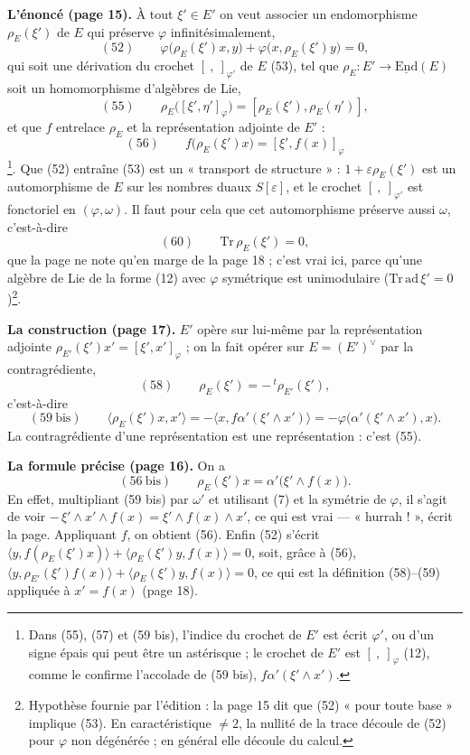 \documentclass[11pt,a4paper]{article}
\begin{document}
\textbf{L'énoncé (page 15).} À tout $\xi' \in E'$ on veut associer un endomorphisme
$\rho_E(\xi')$ de $E$ qui préserve $\varphi$ infinitésimalement,
\[
  (52) \qquad \varphi\bigl(\rho_E(\xi')x, y\bigr) + \varphi\bigl(x, \rho_E(\xi')y\bigr) = 0 ,
\]
qui soit une dérivation du crochet $[\ ,\ ]_{\varphi'}$ de $E$ (53), tel que
$\rho_E : E' \to \underline{\mathrm{End}}(E)$ soit un homomorphisme d'algèbres de Lie,
\[
  (55) \qquad \rho_E\bigl([\xi', \eta']_{\varphi}\bigr) = [\rho_E(\xi'), \rho_E(\eta')] ,
\]
et que $f$ entrelace $\rho_E$ et la représentation adjointe de $E'$ :
\[
  (56) \qquad f\bigl(\rho_E(\xi')x\bigr) = [\xi', f(x)]_{\varphi}
\]
\footnote{Dans (55), (57) et (59 bis), l'indice du crochet de $E'$ est écrit
$\varphi'$, ou d'un signe épais qui peut être un astérisque ; le crochet de $E'$
est $[\ ,\ ]_{\varphi}$ (12), comme le confirme l'accolade de (59 bis),
$f\alpha'(\xi' \wedge x')$.}. Que (52) entraîne (53) est un « transport de
structure » : $1 + \varepsilon\rho_E(\xi')$ est un automorphisme de $E$ sur les nombres
duaux $S[\varepsilon]$, et le crochet $[\ ,\ ]_{\varphi'}$ est fonctoriel en
$(\varphi, \omega)$. Il faut pour cela que cet automorphisme préserve aussi $\omega$,
c'est-à-dire
\[
  (60) \qquad \mathrm{Tr}\, \rho_E(\xi') = 0 ,
\]
que la page ne note qu'en marge de la page 18 ; c'est vrai ici, parce qu'une
algèbre de Lie de la forme (12) avec $\varphi$ symétrique est unimodulaire
($\mathrm{Tr}\, \mathrm{ad}\, \xi' = 0$)\footnote{Hypothèse fournie par l'édition :
la page 15 dit que (52) « pour toute base » implique (53). En caractéristique
$\neq 2$, la nullité de la trace découle de (52) pour $\varphi$ non dégénérée ; en
général elle découle du calcul.}.

\textbf{La construction (page 17).} $E'$ opère sur lui-même par la représentation
adjointe $\rho_{E'}(\xi')x' = [\xi', x']_{\varphi}$ ; on la fait opérer sur
$E = (E')^{\vee}$ par la contragrédiente,
\[
  (58) \qquad \rho_E(\xi') = -\,{}^{t}\rho_{E'}(\xi'),
\]
c'est-à-dire
\[
  (59\ \text{bis}) \qquad \bigl\langle \rho_E(\xi')x, x' \bigr\rangle
  = -\bigl\langle x, f\alpha'(\xi' \wedge x') \bigr\rangle
  = -\varphi\bigl(\alpha'(\xi' \wedge x'), x\bigr).
\]
La contragrédiente d'une représentation est une représentation : c'est (55).

\textbf{La formule précise (page 16).} On a
\[
  (56\ \text{bis}) \qquad \rho_E(\xi')x = \alpha'\bigl(\xi' \wedge f(x)\bigr).
\]
En effet, multipliant (59 bis) par $\omega'$ et utilisant (7) et la symétrie de
$\varphi$, il s'agit de voir $-\,\xi' \wedge x' \wedge f(x) = \xi' \wedge f(x) \wedge x'$,
ce qui est vrai — « hurrah ! », écrit la page. Appliquant $f$, on obtient (56).
Enfin (52) s'écrit
$\langle y, f(\rho_E(\xi')x) \rangle + \langle \rho_E(\xi')y, f(x) \rangle = 0$, soit,
grâce à (56), $\langle y, \rho_{E'}(\xi')f(x) \rangle + \langle \rho_E(\xi')y, f(x) \rangle = 0$,
ce qui est la définition (58)--(59) appliquée à $x' = f(x)$ (page 18).
\end{document}
